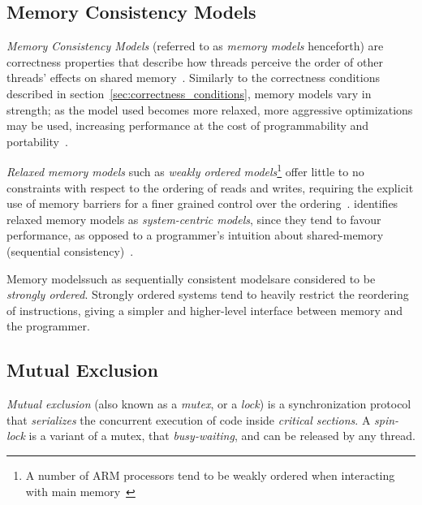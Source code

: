 \subsection{Memory Consistency Models}
\emph{Memory Consistency Models} (referred to as \emph{memory models} henceforth) are correctness properties that describe how
threads perceive the order of other threads' effects on shared
memory~\citep[Section~3.7]{herlihy2020art}. Similarly to the correctness
conditions described in section~\ref{sec:correctness_conditions}, memory
models vary in strength; as the model used becomes more relaxed, more aggressive
optimizations may be used, increasing performance at the cost of
programmability and portability~\citep{gharachorloo1996consistency}.

\emph{Relaxed memory models} such as \emph{weakly ordered models}\footnote{A number of ARM processors tend to be weakly ordered when interacting with main memory~\citep[Section~A3.5.5]{arm2022architecture}} offer little to no
constraints with respect to the ordering of reads and writes, requiring the
explicit use of memory barriers for a finer grained control over the ordering~\citep{gharachorloo1996consistency}. \citeauthor{gharachorloo1996consistency} identifies relaxed
memory models as \emph{system-centric models}, since they tend to favour
performance, as opposed to a programmer's intuition about shared-memory
(sequential consistency)~\citep{gharachorloo1996consistency}.

Memory models\textemdash such as sequentially consistent models\textemdash are considered to be
\emph{strong\-ly ordered}. Strongly ordered systems tend to
heavily restrict the reordering of instructions, giving a simpler and
higher-level interface between memory and the programmer. 

\subsection{Mutual Exclusion}
\emph{Mutual exclusion} (also known as a \emph{mutex}, or a \emph{lock}) is a
synchronization protocol that \emph{serializes} the concurrent execution of
code inside \emph{critical sections}. A \emph{spin-lock} is a variant of a
mutex, that \emph{busy-waiting}, and can be released by any thread.

